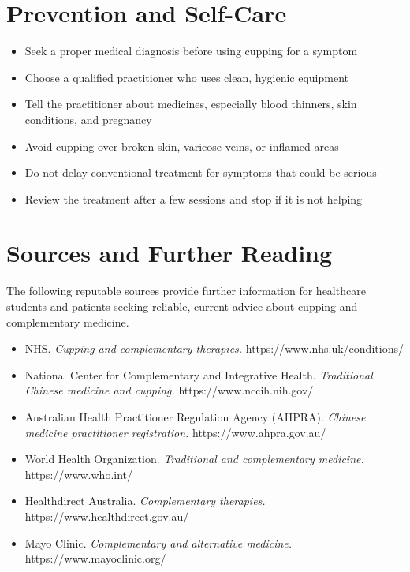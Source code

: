 \section*{Prevention and Self-Care}
\begin{itemize}
    \item Seek a proper medical diagnosis before using cupping for a symptom
    \item Choose a qualified practitioner who uses clean, hygienic equipment
    \item Tell the practitioner about medicines, especially blood thinners, skin conditions, and pregnancy
    \item Avoid cupping over broken skin, varicose veins, or inflamed areas
    \item Do not delay conventional treatment for symptoms that could be serious
    \item Review the treatment after a few sessions and stop if it is not helping
\end{itemize}

\section*{Sources and Further Reading}
The following reputable sources provide further information for healthcare students and patients seeking reliable, current advice about cupping and complementary medicine.

\begin{itemize}
    \item NHS. \textit{Cupping and complementary therapies.} https://www.nhs.uk/conditions/
    \item National Center for Complementary and Integrative Health. \textit{Traditional Chinese medicine and cupping.} https://www.nccih.nih.gov/
    \item Australian Health Practitioner Regulation Agency (AHPRA). \textit{Chinese medicine practitioner registration.} https://www.ahpra.gov.au/
    \item World Health Organization. \textit{Traditional and complementary medicine.} https://www.who.int/
    \item Healthdirect Australia. \textit{Complementary therapies.} https://www.healthdirect.gov.au/
    \item Mayo Clinic. \textit{Complementary and alternative medicine.} https://www.mayoclinic.org/
\end{itemize}
